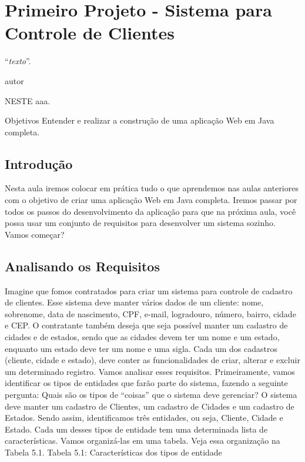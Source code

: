 \chapter{Primeiro Projeto - Sistema para Controle de Clientes}
\epigraph{``\textit{texto}''.}{autor}

\lettrine[lines=4, lhang=0.1, lraise=0, loversize=0.2, findent=0.1em]{\textcolor{corAzulTema}{N}}{ESTE} aaa.

Objetivos
Entender e realizar a construção de uma aplicação Web em Java completa.


\section{Introdução}


Nesta aula iremos colocar em prática tudo o que aprendemos nas aulas anteriores com o objetivo de criar uma aplicação Web em Java completa. Iremos passar por todos os passos do desenvolvimento da aplicação para que na próxima aula, você possa usar um conjunto de requisitos para desenvolver um sistema sozinho. Vamos começar?

\section{Analisando os Requisitos}

Imagine que fomos contratados para criar um sistema para controle de cadastro de clientes. Esse sistema deve manter vários dados de um cliente: nome, sobrenome, data de nascimento, CPF, e-mail, logradouro, número, bairro, cidade e CEP. O contratante também deseja que seja possível manter um cadastro de cidades e de estados, sendo que as cidades devem ter um nome e um estado, enquanto um estado deve ter um nome e uma sigla. Cada um dos cadastros (cliente, cidade e estado), deve conter as funcionalidades de criar, alterar e excluir um determinado registro.
Vamos analisar esses requisitos. Primeiramente, vamos identificar os tipos de entidades que farão parte do sistema, fazendo a seguinte pergunta: Quais são os tipos de “coisas” que o sistema deve gerenciar? O sistema deve manter um cadastro de Clientes, um cadastro de Cidades e um cadastro de Estados. Sendo assim, identificamos três entidades, ou seja, Cliente, Cidade e Estado.
Cada um desses tipos de entidade tem uma determinada lista de características. Vamos organizá-las em uma tabela. Veja essa organização na Tabela 5.1.
Tabela 5.1: Características dos tipos de entidade

